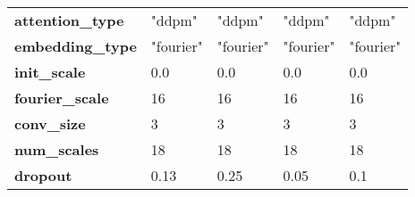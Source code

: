 \begin{table}[H]
\begin{center}
\begin{tabular}{lllll}
\textbf{attention\_type }                & "ddpm"              & "ddpm"             & "ddpm"           & "ddpm"             \\
\textbf{embedding\_type }                & "fourier"           & "fourier"          & "fourier"        & "fourier"          \\
\textbf{init\_scale }                    & 0.0                 & 0.0                & 0.0              & 0.0                \\
\textbf{fourier\_scale }                 & 16                  & 16                 & 16               & 16                 \\
\textbf{conv\_size }                     & 3                   & 3                  & 3                & 3                  \\
\textbf{num\_scales }                    & 18                  & 18                 & 18               & 18                 \\
\textbf{dropout }                        & 0.13                & 0.25               & 0.05             & 0.1         \\      
\bottomrule
\end{tabular}
\end{center}
\end{table}

